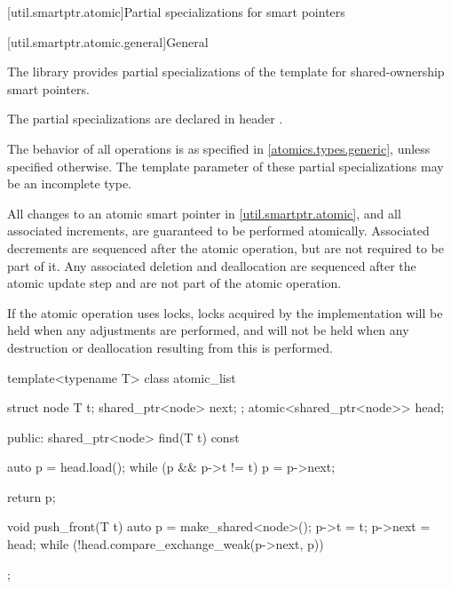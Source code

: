 [util.smartptr.atomic]{Partial specializations for smart pointers}%
%

[util.smartptr.atomic.general]{General}

\pnum
The library provides partial specializations of the  template
for shared-ownership smart pointers.
\begin{note}
The partial specializations are declared in header .
\end{note}
The behavior of all operations is as specified in \ref{atomics.types.generic},
unless specified otherwise.
The template parameter  of these partial specializations
may be an incomplete type.

\pnum
All changes to an atomic smart pointer in \ref{util.smartptr.atomic}, and
all associated  increments,
are guaranteed to be performed atomically.
Associated  decrements
are sequenced after the atomic operation,
but are not required to be part of it.
Any associated deletion and deallocation
are sequenced after the atomic update step and
are not part of the atomic operation.
\begin{note}
If the atomic operation uses locks,
locks acquired by the implementation
will be held when any  adjustments are performed, and
will not be held when any destruction or deallocation
resulting from this is performed.
\end{note}

\pnum
\begin{example}
\begin{codeblock}
template<typename T> class atomic_list {
  struct node {
    T t;
    shared_ptr<node> next;
  };
  atomic<shared_ptr<node>> head;

public:
  shared_ptr<node> find(T t) const {
    auto p = head.load();
    while (p && p->t != t)
      p = p->next;

    return p;
  }

  void push_front(T t) {
    auto p = make_shared<node>();
    p->t = t;
    p->next = head;
    while (!head.compare_exchange_weak(p->next, p)) {}
  }
};
\end{codeblock}
\end{example}

